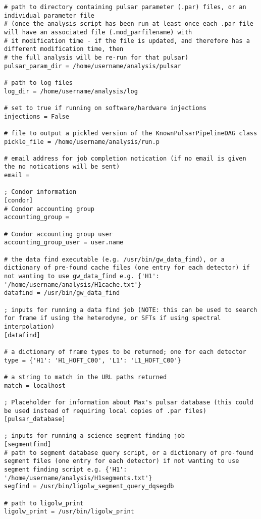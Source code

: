 \begin{lstlisting}[frame=single]
# path to directory containing pulsar parameter (.par) files, or an individual parameter file
# (once the analysis script has been run at least once each .par file will have an associated file (.mod_parfilename) with
# it modification time - if the file is updated, and therefore has a different modification time, then
# the full analysis will be re-run for that pulsar)
pulsar_param_dir = /home/username/analysis/pulsar

# path to log files
log_dir = /home/username/analysis/log

# set to true if running on software/hardware injections
injections = False

# file to output a pickled version of the KnownPulsarPipelineDAG class
pickle_file = /home/username/analysis/run.p

# email address for job completion notication (if no email is given the no notications will be sent)
email =

; Condor information
[condor]
# Condor accounting group
accounting_group =

# Condor accounting group user
accounting_group_user = user.name

# the data find executable (e.g. /usr/bin/gw_data_find), or a dictionary of pre-found cache files (one entry for each detector) if not wanting to use gw_data_find e.g. {'H1': '/home/username/analysis/H1cache.txt'}
datafind = /usr/bin/gw_data_find

; inputs for running a data find job (NOTE: this can be used to search for frame if using the heterodyne, or SFTs if using spectral interpolation)
[datafind]

# a dictionary of frame types to be returned; one for each detector
type = {'H1': 'H1_HOFT_C00', 'L1': 'L1_HOFT_C00'}

# a string to match in the URL paths returned
match = localhost

; Placeholder for information about Max's pulsar database (this could be used instead of requiring local copies of .par files)
[pulsar_database]

; inputs for running a science segment finding job
[segmentfind]
# path to segment database query script, or a dictionary of pre-found segment files (one entry for each detector) if not wanting to use segment finding script e.g. {'H1': '/home/username/analysis/H1segments.txt'}
segfind = /usr/bin/ligolw_segment_query_dqsegdb

# path to ligolw_print
ligolw_print = /usr/bin/ligolw_print


\end{lstlisting}
